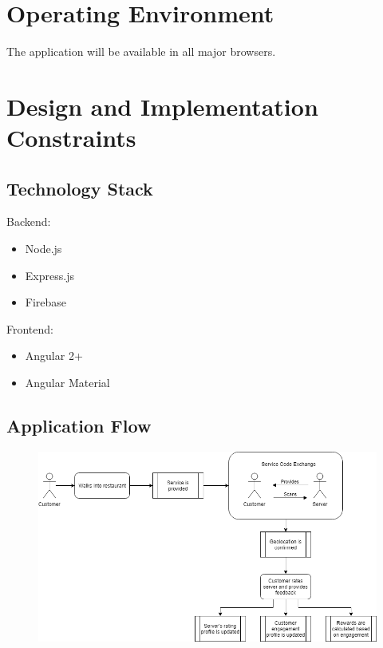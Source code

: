 \documentclass{scrreprt}
\begin{document}

\section{Operating Environment}
The application will be available in all major browsers.

\section{Design and Implementation Constraints}
\subsection{Technology Stack}
Backend:
\begin{itemize}
    \item Node.js
    \item Express.js
    \item Firebase
\end{itemize}
Frontend:
\begin{itemize}
    \item Angular 2+
    \item Angular Material
\end{itemize}
\newpage
\subsection{Application Flow}
\begin{figure}[h]
	\includegraphics[width=\textwidth]{uml/process-flow-diagram}
	\centering
\end{figure}
\end{document}
